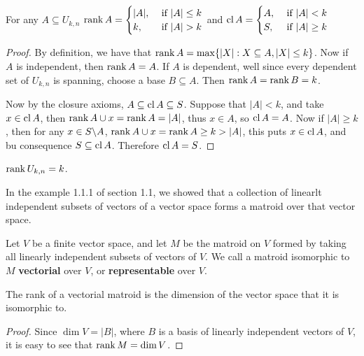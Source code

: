 \begin{corollary}
   For any $A \subseteq U_{k,n}$ $\rank{A}=\begin{cases}
                                        |A|, & \text{ if } |A| \leq k \\
                                        k, & \text{ if } |A|>k \\
                                    \end{cases}$
   and $\operatorname{cl}{A}=\begin{cases}
                    A, & \text{ if } |A|<k \\
                    S, & \text{ if } |A| \geq k \\
               \end{cases}$
\end{corollary}
\begin{proof}
    By definition, we have that $\operatorname{rank}{A}=\max\{|X|: X \subseteq A, |X|\leq k\}$. Now if $A$ is
    independent, then  $\operatorname{rank}{A}=A$. If $A$ is dependent, well since every dependent set of
    $U_{k,n}$ is spanning, choose a base $B \subseteq A$. Then  $\operatorname{rank}{A}=\operatorname{rank}{B}=k$.

    Now by the closure axioms,  $A \subseteq \operatorname{cl}{A} \subseteq S$. Suppose that $|A|<k$, and take  $x
    \in \operatorname{cl}{A}$, then $\operatorname{rank}{A \cup x}=\operatorname{rank}{A}=|A|$, thus $x \in A$, so
$\operatorname{cl}{A}=A$. Now if $|A| \geq k$, then for any  $x \in S\backslash A$, $\operatorname{rank}{A \cup x}=\operatorname{rank}{A} \geq
k>|A|$, this puts $x \in \operatorname{cl}{A}$, and bu consequence $S \subseteq \operatorname{cl}{A}$. Therefore $\operatorname{cl}{A}=S$.
\end{proof}
\begin{corollary}
    $\operatorname{rank}{U_{k,n}}=k$.
\end{corollary}

In the example 1.1.1 of section 1.1, we showed that a collection of linearlt independent subsets of
vectors of a vector space forms a matroid over that vector space.

\begin{definition}
    Let $V$ be a finite vector space, and let $M$ be the matroid on $V$ formed by taking all
    linearly independent subsets of vectors of $V$. We call a matroid isomorphic to $M$
    \textbf{vectorial} over $V$, or \textbf {representable} over $V$.
\end{definition}

\begin{proposition}\label{1.2.2}
    The rank of a vectorial matroid is the dimension of the vector space that it is isomorphic to.
\end{proposition}
\begin{proof}
    Since $\dim{V}=|B|$, where $B$ is a basis of linearly independent vectors of  $V$, it is easy to
    see that  $\operatorname{rank}{M}=\dim{V}$.
\end{proof}


